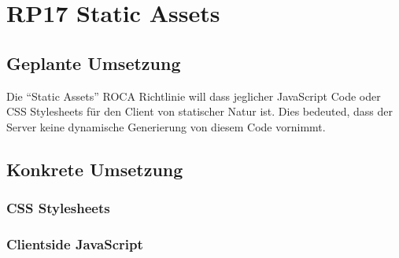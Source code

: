 \section{RP17 Static Assets}
\subsection*{Geplante Umsetzung}
Die ``Static Assets'' ROCA Richtlinie will dass jeglicher JavaScript Code oder CSS Stylesheets für den Client von statischer Natur ist. Dies bedeuted, dass der Server keine dynamische Generierung von diesem Code vornimmt.



\subsection*{Konkrete Umsetzung}
\subsubsection*{CSS Stylesheets}


\subsubsection*{Clientside JavaScript}

